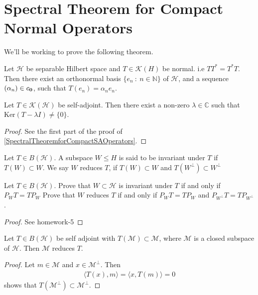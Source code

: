 \section{Spectral Theorem for Compact Normal Operators}
We'll be working to prove the following theorem.
\begin{theorem}
  Let $\mathcal{H}$ be separable Hilbert space and $T\in
  \mathcal{K}(H)$ be normal. i.e
  $TT^* = T^*T$. Then there exist an orthonormal basis $\{ e_n  \ :
  \  n \in \mathbb{N} \}$ of $\mathcal{H}$, and a sequence $(\alpha_n) \in
  c_{\bf 0}$, such that $T(e_n) = \alpha_n e_n$.
\end{theorem}

\begin{lemma}
  Let $T \in \mathcal{K}(\mathcal{H})$ be self-adjoint. Then there
  exist a non-zero $\lambda \in \mathbb{C}$ such that $
  \textrm{Ker}(T - \lambda I) \neq \{ 0 \}$.
\end{lemma}
\begin{proof}
  See the first part of the proof of
  \autoref{SpectralTheoremforCompactSAOperators}.
\end{proof}

\begin{definition}
  Let $T \in B(\mathcal{H})$. A subspace $W \leqslant H$ is said to be
  invariant under $T$ if $T(W) \subset W$. We say $W$ reduces $T$, if
  $T(W) \subset W$ and $T(W^\perp) \subset W^\perp$
\end{definition}

\begin{example}
  Let $T \in B(\mathcal{H})$.
  Prove that $W \subset \mathcal{H}$ is invariant under $T$ if and
  only if $P_WT = TP_W$
  Prove that $W$ reduces $T$ if and only if $P_WT = TP_W$ and
  $P_{W^\perp}T = T P_{W^\perp}$.
\end{example}
\begin{proof}
  See homework-5
\end{proof}

\begin{proposition}
  \label{InvariantSubspacesofSelfAdjointOperatorsReduce} Let $T \in
  B(\mathcal{H})$ be self adjoint with $T(\mathcal{M}) \subset
  \mathcal{M}$, where $\mathcal{M}$ is a closed subspace of
  $\mathcal{H}$. Then $\mathcal{M}$ reduces $T$.
\end{proposition}
\begin{proof}
  Let $m \in \mathcal{M}$ and $x \in \mathcal{M}^\perp$. Then
  \begin{align*}
    \langle T(x) ,  m \rangle = \langle x , T(m) \rangle = 0
  \end{align*}
  shows that $T(\mathcal{M}^\perp) \subset \mathcal{M}^\perp$.
\end{proof}


